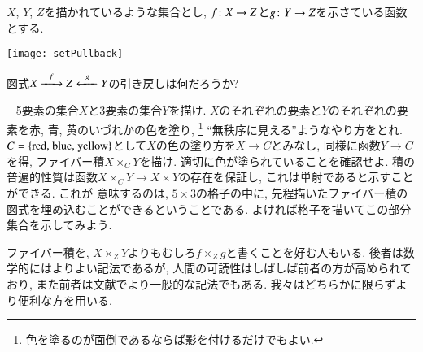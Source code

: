 \begin{exercise}
$X$, $Y$, $Z$を描かれているような集合とし, $f\colon X\rightarrow Z$と$g\colon Y\rightarrow Z$を示さている函数とする. 
\begin{center}
\texttt{[image: setPullback]}
\end{center}
図式$X\xrightarrow{\ \ f\ \ }Z\xleftarrow{\ \ g\ \ }Y$の引き戻しは何だろうか?
\end{exercise}

\begin{exercise}~
\sexc 5要素の集合$X$と3要素の集合$Y$を描け. $X$のそれぞれの要素と$Y$のそれぞれの要素を赤, 青, 黄のいづれかの色を塗り, 
\footnote{色を塗るのが面倒であるならば影を付けるだけでもよい.}
``無秩序に見える''ようなやり方をとれ. $C=\{\tn{red, blue, yellow}\}$として$X$の色の塗り方を$X\to C$とみなし, 同様に函数$Y\to C$を得, ファイバー積$X\times_CY$を描け. 適切に色が塗られていることを確認せよ.
\next 積の普遍的性質は函数$X\times_CY\to X\times Y$の存在を保証し, これは単射であると示すことができる. これが 意味するのは, $5\times 3$の格子の中に, 先程描いたファイバー積の図式を埋め込むことができるということである. よければ格子を描いてこの部分集合を示してみよう.
\endsexc
\end{exercise}

\begin{remark}


ファイバー積を, $X\times_ZY$よりもむしろ$f\times_Zg$と書くことを好む人もいる. 後者は数学的にはよりよい記法であるが, 人間の可読性はしばしば前者の方が高められており, また前者は文献でより一般的な記法でもある. 我々はどちらかに限らずより便利な方を用いる.

\end{remark}

